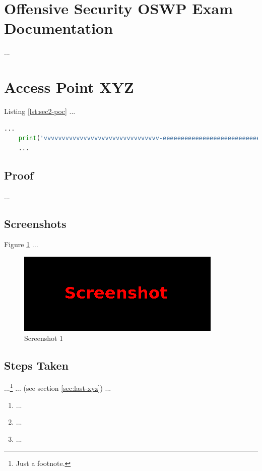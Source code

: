 %
%
%
\section{Offensive Security OSWP Exam Documentation}\label{sec:sec1}
%
...
%
%
%
\section{Access Point XYZ}\label{sec:sec2}
%
Listing \ref{lst:sec2-poc} ...\\

\begin{lstlisting}[language=Python,caption={Proof of Concept}, label={lst:sec2-poc}]
    ...
    print('vvvvvvvvvvvvvvvvvvvvvvvvvvvvvvvv-eeeeeeeeeeeeeeeeeeeeeeeeeeeeeeeeeeeeeeeeeee-looooooooooooooooooooooong-striiiiiiiiiiiiiing')
    ...
\end{lstlisting}
%
%
%
\subsection{Proof}\label{sec:sec2-proof}
%
...
%
%
%
\subsection{Screenshots}\label{sec:sec2-screens}
%
Figure \ref{fig:sec2-screen1} ...

\begin{figure}[H]
    \centering
    \includegraphics[width=\textwidth]{img/assignment1/screen1.png}
    \caption{Screenshot 1}\label{fig:sec2-screen1}
\end{figure}
%
%
%
\subsection{Steps Taken}\label{sec:sec2-steps}
%
...\footnote{Just a footnote.} ... (see section \ref{sec:last-xyz}) ...

\begin{enumerate}
    \item ...
    \item ...
    \item ...
\end{enumerate}
%
%
%

